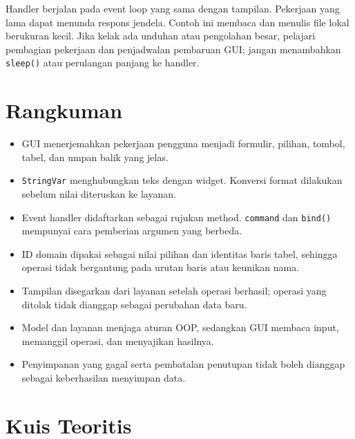 \begin{tips}
Handler berjalan pada event loop yang sama dengan tampilan. Pekerjaan yang lama dapat menunda respons jendela. Contoh ini membaca dan menulis file lokal berukuran kecil. Jika kelak ada unduhan atau pengolahan besar, pelajari pembagian pekerjaan dan penjadwalan pembaruan GUI; jangan menambahkan \texttt{sleep()} atau perulangan panjang ke handler.
\end{tips}

\section{Rangkuman}

\begin{itemize}
  \item GUI menerjemahkan pekerjaan pengguna menjadi formulir, pilihan, tombol, tabel, dan umpan balik yang jelas.
  \item \texttt{StringVar} menghubungkan teks dengan widget. Konversi format dilakukan sebelum nilai diteruskan ke layanan.
  \item Event handler didaftarkan sebagai rujukan method. \texttt{command} dan \texttt{bind()} mempunyai cara pemberian argumen yang berbeda.
  \item ID domain dipakai sebagai nilai pilihan dan identitas baris tabel, sehingga operasi tidak bergantung pada urutan baris atau keunikan nama.
  \item Tampilan disegarkan dari layanan setelah operasi berhasil; operasi yang ditolak tidak dianggap sebagai perubahan data baru.
  \item Model dan layanan menjaga aturan OOP, sedangkan GUI membaca input, memanggil operasi, dan menyajikan hasilnya.
  \item Penyimpanan yang gagal serta pembatalan penutupan tidak boleh dianggap sebagai keberhasilan menyimpan data.
\end{itemize}

\section{Kuis Teoritis}

